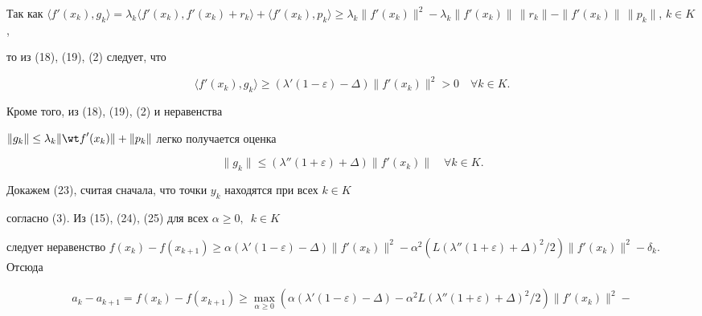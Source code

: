 \begin{pf}


Так как $\langle {{f}'(x_k),g_k} \rangle =


\lambda_k\langle {{f}'(x_k),{f}'(x_k)+r_k} \rangle +\langle {{f}'(x_k),p_k}


\rangle \ge \lambda_k \|{{f}'(x_k)} \|^2-\lambda_k\|{{f}'(x_k)}\|\,\|{r_k}\|-


\|{{f}'(x_k)} \|\,\|{p_k} \|$, $k\in K$,


то из (18), (19), (2) следует, что


\begin{equation}


\langle {{f}'(x_k),g_k} \rangle \ge ({\lambda}'(1-\varepsilon)-\Delta)


\|{{f}'(x_k)} \|^2>0\quad \forall k\in K.


\end{equation}


Кроме того, из (18), (19), (2) и неравенства


$\|{g_k}\|\le\lambda_k\|{{\wt f}'(x_k)} \|+


\|{p_k} \|$ легко получается оценка


\begin{equation}


\|{g_k} \|\le ({\lambda}''(1+\varepsilon)+\Delta) \|{{f}'(x_k)} \|


\quad \forall k\in K.


\end{equation}





Докажем (23), считая сначала, что точки $y_k$ находятся при всех $k\in K$


согласно (3). Из (15), (24), (25) для всех $\alpha \ge 0,\enspace k\in K$


следует неравенство $f(x_k)-f(x_{k+1})\ge \alpha ({\lambda


}'(1-\varepsilon)-\Delta) \|{{f}'(x_k)} \|^2-\alpha


^2(L({\lambda}''(1+\varepsilon)+\Delta)^2/2) \|{{f}'(x_k)}


\|^2 -\delta_k$. Отсюда


\begin{multline}


a_k-a_{k+1}=f(x_k)-f(x_{k+1})\ge \max_{\alpha \ge 0}(\alpha ({\lambda}'(1-


\varepsilon)-\Delta)-\alpha^2L({\lambda}''


(1+\varepsilon)+\Delta)^2/2) \|{{f}'(x_k)} \|^2- \\



\end{multline}
\end{pf}
